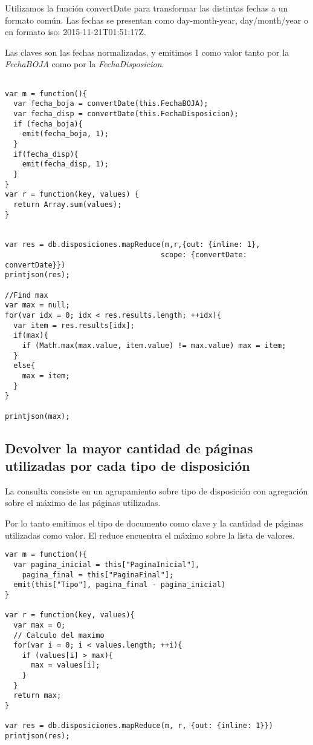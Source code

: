 Utilizamos la función convertDate para transformar las distintas fechas a un formato
común. Las fechas se presentan como day-month-year, day/month/year o en formato iso:
2015-11-21T01:51:17Z.

Las claves son las fechas normalizadas, y emitimos 1 como valor tanto por la \emph{FechaBOJA}
como por la \emph{FechaDisposicion}.

\begin{lstlisting}

var m = function(){
  var fecha_boja = convertDate(this.FechaBOJA);
  var fecha_disp = convertDate(this.FechaDisposicion);
  if (fecha_boja){
    emit(fecha_boja, 1);
  }
  if(fecha_disp){
    emit(fecha_disp, 1);
  }
}
var r = function(key, values) {
  return Array.sum(values);
}


var res = db.disposiciones.mapReduce(m,r,{out: {inline: 1},
                                    scope: {convertDate: convertDate}})
printjson(res);

//Find max
var max = null;
for(var idx = 0; idx < res.results.length; ++idx){
  var item = res.results[idx];
  if(max){
    if (Math.max(max.value, item.value) != max.value) max = item;
  }
  else{
    max = item;
  }
}

printjson(max);

\end{lstlisting}

\subsection{Devolver la mayor cantidad de páginas utilizadas por cada tipo de disposición}

La consulta consiste en un agrupamiento sobre tipo de disposición
con agregación sobre el máximo de las páginas utilizadas.

Por lo tanto emitimos el tipo de documento como clave y la cantidad de páginas utilizadas
como valor. El reduce encuentra el máximo sobre la lista de valores.

\begin{lstlisting}
var m = function(){
  var pagina_inicial = this["PaginaInicial"],
    pagina_final = this["PaginaFinal"];
  emit(this["Tipo"], pagina_final - pagina_inicial)
}

var r = function(key, values){
  var max = 0;
  // Calculo del maximo
  for(var i = 0; i < values.length; ++i){
    if (values[i] > max){
      max = values[i];
    }
  }
  return max;
}

var res = db.disposiciones.mapReduce(m, r, {out: {inline: 1}})
printjson(res);
\end{lstlisting}

